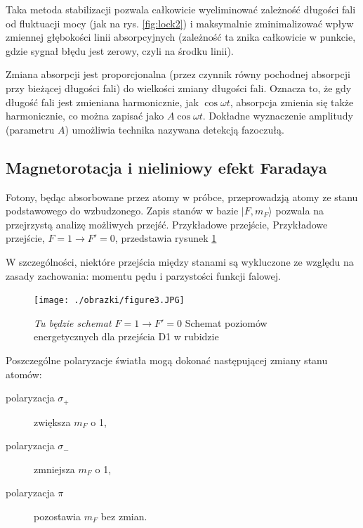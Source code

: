 \documentclass[a4paper,10pt]{article}
\begin{document}
 Taka metoda stabilizacji pozwala całkowicie wyeliminować zależność długości fali od fluktuacji mocy (jak na rys. \ref{fig:lock2})  i maksymalnie zminimalizować wpływ zmiennej głębokości linii absorpcyjnych (zależność ta znika całkowicie w punkcie, gdzie sygnał błędu jest zerowy, czyli na środku linii).

Zmiana absorpcji jest proporcjonalna (przez czynnik równy pochodnej absorpcji przy bieżącej długości fali) do wielkości zmiany długości fali. Oznacza to, że gdy długość fali jest zmieniana harmonicznie, jak $\cos \omega t$, absorpcja zmienia się także harmonicznie, co można zapisać jako $A \cos \omega t$. Dokładne wyznaczenie amplitudy (parametru $A$)
umożliwia technika nazywana detekcją fazoczułą.

\subsection{Magnetorotacja i nieliniowy efekt Faradaya}

Fotony, będąc absorbowane przez atomy w próbce, przeprowadzją atomy ze stanu podstawowego do wzbudzonego.
Zapis stanów w bazie $|F,m_F\rangle$ pozwala na przejrzystą analizę możliwych przejść.
Przykładowe przejście, Przykładowe przejście, $F=1 \rightarrow F'=0$, przedstawia rysunek \ref{poziomyL}

W szczególności, niektóre przejścia między stanami są wykluczone ze względu na zasady zachowania: momentu pędu i parzystości funkcji falowej. 

\begin{figure}
\begin{center}
 \texttt{[image: ./obrazki/figure3.JPG]}
\end{center}
\caption{\emph{Tu będzie schemat $F=1 \rightarrow F'=0$} Schemat poziomów energetycznych dla przejścia D1 w rubidzie}
\label{poziomyL}
\end{figure}

Poszczególne polaryzacje światła mogą dokonać następującej zmiany stanu atomów:
\begin{center}
\begin{description}
\item[polaryzacja $\sigma_+$] zwiększa $m_F$ o 1,
\item[polaryzacja $\sigma_-$] zmniejsza $m_F$ o 1,
\item[polaryzacja $\pi$] pozostawia $m_F$ bez zmian.
\end{description}
\end{center}
\end{document}
